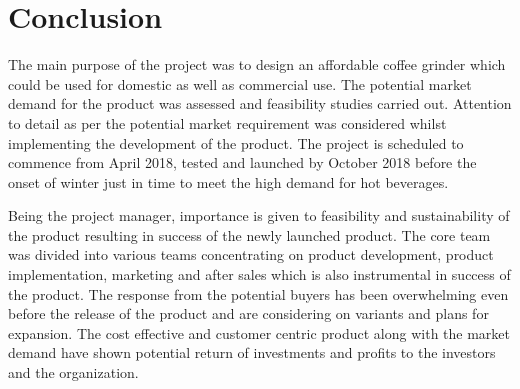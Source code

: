  \chapter*{Conclusion}

\noindent The main purpose of the project was to design an affordable coffee grinder which could be used for domestic as well as commercial use. The potential market demand for the product was assessed and feasibility studies carried out. Attention to detail as per the potential market requirement was considered whilst implementing the development of the product. The project is scheduled to commence from April 2018, tested and launched by October 2018 before the onset of winter just in time to meet the high demand for hot beverages.

\noindent Being the project manager, importance is given to feasibility and sustainability of the product resulting in success of the newly launched product. The core team was divided into various teams concentrating on product development, product implementation, marketing and after sales which is also instrumental in success of the product. The response from the potential buyers has been overwhelming even before the release of the product and are considering on variants and plans for expansion. The cost effective and customer centric product along with the market demand have shown potential return of investments and profits to the investors and the organization.





